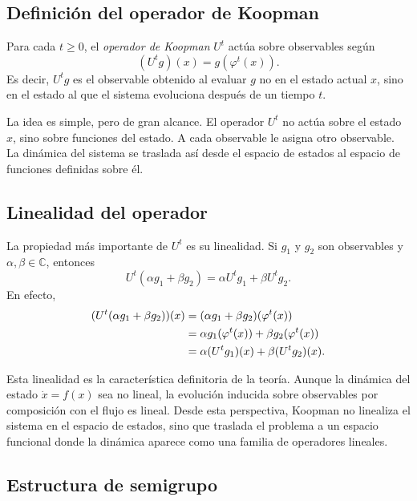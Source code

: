 \subsection{Definición del operador de Koopman}

Para cada \(t\ge 0\), el \emph{operador de Koopman} \(U^t\) actúa sobre observables según
\begin{equation}
(U^t g)(x)=g(\varphi^t(x)).
\label{eq:Koopman_operator_definition}
\end{equation}
Es decir, \(U^t g\) es el observable obtenido al evaluar \(g\) no en el estado actual \(x\), sino en el estado al que el sistema evoluciona después de un tiempo \(t\).

La idea es simple, pero de gran alcance. El operador \(U^t\) no actúa sobre el estado \(x\), sino sobre funciones del estado. A cada observable le asigna otro observable. La dinámica del sistema se traslada así desde el espacio de estados al espacio de funciones definidas sobre él.

\subsection{Linealidad del operador}

La propiedad más importante de \(U^t\) es su linealidad. Si \(g_1\) y \(g_2\) son observables y \(\alpha,\beta\in\mathbb{C}\), entonces
\begin{equation}
U^t(\alpha g_1+\beta g_2)
=
\alpha U^t g_1+\beta U^t g_2.
\label{eq:Koopman_operator_linearity}
\end{equation}
En efecto,
\begin{align}
(U^t(\alpha g_1+\beta g_2))(x)
&=
(\alpha g_1+\beta g_2)(\varphi^t(x)) \notag\\
&=
\alpha g_1(\varphi^t(x))+\beta g_2(\varphi^t(x)) \notag\\
&=
\alpha (U^t g_1)(x)+\beta (U^t g_2)(x).
\label{eq:Koopman_operator_linearity_proof}
\end{align}

Esta linealidad es la característica definitoria de la teoría. Aunque la dinámica del estado \(\dot{x}=f(x)\) sea no lineal, la evolución inducida sobre observables por composición con el flujo es lineal. Desde esta perspectiva, Koopman no linealiza el sistema en el espacio de estados, sino que traslada el problema a un espacio funcional donde la dinámica aparece como una familia de operadores lineales.

\subsection{Estructura de semigrupo}

